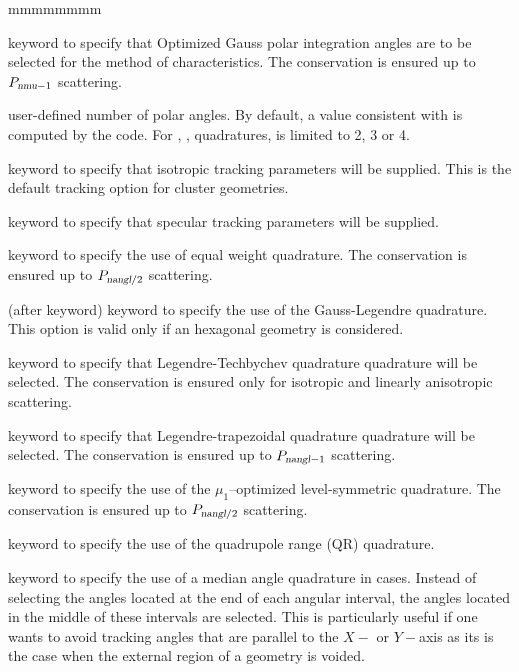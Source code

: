 \begin{ListeDeDescription}{mmmmmmmm}
\item[\moc{OGAU}] keyword to specify that Optimized Gauss polar integration angles are to be
selected for the method of characteristics.\cite{LCMD,LeTellierpa} The conservation is ensured up to $P_{\dusa{nmu}-1}$ scattering.

\item[\dusa{nmu}]  user-defined number of polar angles. By default, a value consistent with  is computed by the code. For , ,  quadratures,  is limited to 2, 3 or 4.

\item[\moc{TISO}] keyword to specify that isotropic tracking parameters will be supplied. This is the
default tracking option for cluster geometries. 

\item[\moc{TSPC}] keyword to specify that specular tracking parameters will be supplied.

\item[\moc{EQW}] keyword to specify the use of equal weight quadrature.\cite{eqn} The conservation is ensured up to $P_{\dusa{nangl}/2}$ scattering.

\item[\moc{GAUS}] (after  keyword) keyword to specify the use of the Gauss-Legendre quadrature. This option is valid only if an 
hexagonal geometry is considered.

\item[\moc{PNTN}] keyword to specify that Legendre-Techbychev quadrature quadrature will be selected.\cite{pntn} The conservation is ensured only for isotropic and linearly anisotropic scattering.

\item[\moc{SMS}] keyword to specify that Legendre-trapezoidal quadrature quadrature will be selected.\cite{sms} The conservation is ensured up to $P_{\dusa{nangl}-1}$ scattering.

\item[\moc{LSN}] keyword to specify the use of the $\mu_1$--optimized level-symmetric quadrature. The conservation is ensured up to $P_{\dusa{nangl}/2}$ scattering.

\item[\moc{QRN}] keyword to specify the use of the quadrupole range (QR) quadrature.\cite{quadrupole}

\item[\moc{MEDI}] keyword to specify the use of a median angle quadrature in  cases. Instead of
selecting the angles located at the end of each angular interval, the angles located in the middle of
these intervals are selected. This is particularly useful if one wants to avoid
tracking angles that are parallel to the $X-$ or $Y-$axis as its is the case
when the external region of a  geometry is voided.


\end{ListeDeDescription}
